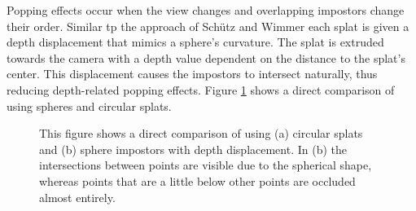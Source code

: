 \par

Popping effects occur when the view changes and overlapping impostors change their order. Similar tp the approach of Schütz and Wimmer \cite{SCHUETZ-2015-HQP} each splat is given a depth displacement that mimics a sphere's curvature. The splat is extruded towards the camera with a depth value dependent on the distance to the splat's center. This displacement causes the impostors to intersect naturally, thus reducing depth-related popping effects. Figure \ref{fig:point_sprites} shows a direct comparison of using spheres and circular splats. 


\begin{figure}
\centering
{}
  
\caption[Comparison of (a) circular splats and (b) sphere impostors]
{This figure shows a direct comparison of using (a) circular splats and (b) sphere impostors with depth displacement. In (b) the intersections between points are visible due to the spherical shape, whereas points that are a little below other points are occluded almost entirely.}
\label{fig:point_sprites}
\end{figure}